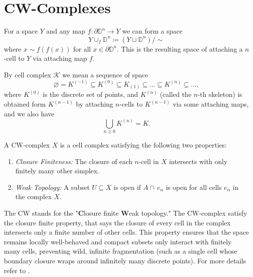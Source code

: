 
\newpage
\section{CW-Complexes}
For a space \(Y\) and any map \(f: \partial	\mathbb D^n \to Y\) we can form a space 
\[Y \cup_f \mathbb D^n \coloneq (Y \sqcup \mathbb D^n)/\sim\]
where \(x \sim f(f(x))\) for all \(x \in \partial \mathbb D^n\).
This is the resulting space of attaching a \(n\)-cell to \(Y\) via attaching map \(f\).

\begin{definition}
	By cell complex \(\mathcal K\) we mean a sequence of space
	\[\varnothing = K^{(-1)} \subseteq K^{(0)} \subseteq K_{(1)} \subseteq \dots \subseteq K^{(n)} \subseteq \dots,\]
	where \(K^{(0)}\) is the discrete set of points, and \(K^{(n)}\) (called the \(n\)-th skeleton) is obtained form \(K^{(n-1)}\) by attaching \(n\)-cells to \(K^{(n-1)}\) via some attaching maps, and we also have 
	\[\bigcup_{n \geq 0} K^{(n)} = K.\]
\end{definition}

\begin{definition}
	A CW-complex \(X\) is a cell complex satisfying the following two properties:
	\begin{enumerate}
		\item \emph{Closure Finiteness:}  The closure of each \(n\)-cell in \(X\) intersects with only finitely many other simplex.
		\item \emph{Weak Topology:}  A subset \(U \subseteq X\) is open if \( A \cap\,  e_\alpha\) is open for all cells \(e_\alpha\) in the complex \(X\).
	\end{enumerate}

	The CW stands for the "\textbf{C}losure finite \textbf{W}eak topology."
	The CW-complex satisfy the closure finite property, that says the closure of every cell in the complex intersects only a finite number of other cells.
	This property ensures that the space remains locally well-behaved and compact subsets only interact with finitely many cells, preventing wild, infinite fragmentation (such as a single cell whose boundary closure wraps around infinitely many discrete points).
	For more details refer to \cite[p.~221-223]{Whitehead_1949}.
\end{definition}


